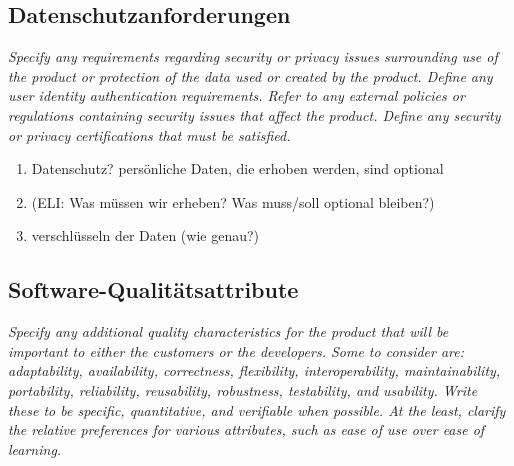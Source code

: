 \subsection{Datenschutzanforderungen}
\textit{Specify any requirements regarding security or privacy issues 
surrounding use of the product or protection of the data used or created by the product.
Define any user identity authentication requirements. 
Refer to any external policies or regulations containing security issues that affect the product. 
Define any security or privacy certifications that must be satisfied.}

\begin{enumerate}
    \item Datenschutz? persönliche Daten, die erhoben werden, sind optional%
    \item (ELI: Was müssen wir erheben? Was muss/soll optional bleiben?)
    \item verschlüsseln der Daten (wie genau?)
\end{enumerate}


\subsection{Software-Qualitätsattribute}
\textit{Specify any additional quality characteristics for the product that will be important to either the customers or
the developers.
Some to consider are: adaptability, availability, correctness, flexibility, 
interoperability, maintainability, portability, reliability, reusability, 
robustness, testability, and usability. Write these to be specific, quantitative, 
and verifiable when possible.
At the least, clarify the relative preferences for various attributes, 
such as ease of use over ease of learning.}


